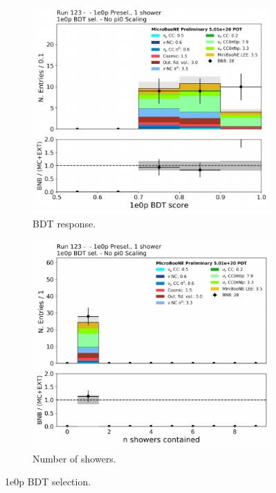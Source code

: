 \begin{figure}[H]
\begin{center}
\begin{subfigure}[b]{0.3\textwidth}
    \includegraphics[width=1.00\textwidth]{Fakedata/set1/zp_postsel_bdt.pdf}
    \caption{\label{fig:fakedata:set1:zp_postsel_bdt} BDT response.}
    \end{subfigure}
    \begin{subfigure}[b]{0.3\textwidth}
    \centering
    \includegraphics[width=1.00\textwidth]{Fakedata/set1/zp_postsel_nshr.pdf}
    \caption{\label{fig:fakedata:set1:zp_postsel_nshr} Number of showers.}
    \end{subfigure}
\caption{\label{fig:fakedata:set1:zpsel} 1e0p BDT selection.}
\end{center}
\end{figure}

